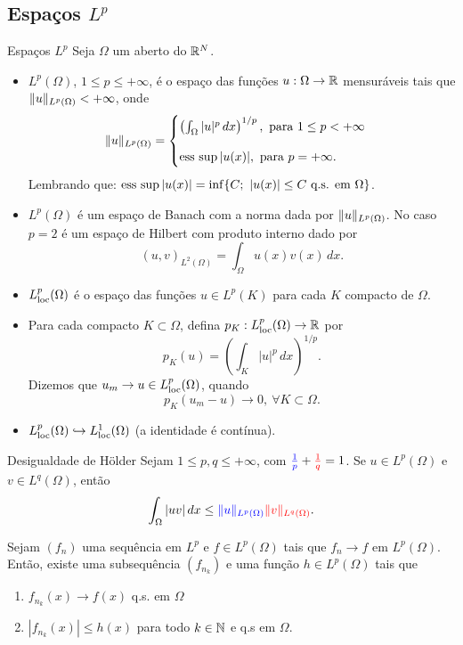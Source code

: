 \subsection*{Espaços $L^p$}
\begin{frame}{Espaços $L^p$}
Seja $\Omega$ um aberto do $\mathbb{R}^N$. 
\begin{itemize}
	\item $L^p(\Omega)$, $1\leq p\leq +\infty$, é o espaço das funções $u:\Omega \to \mathbb{R}$ mensuráveis tais que $\lVert u\rVert_{L^p(\Omega)}<+\infty$, onde 
\[	\lVert u\rVert_{L^p(\Omega)}=
\begin{cases}
\left(\int_\Omega |u|^p\,dx\right)^{1/p}, \text{ para } 1\leq p< +\infty \\[1em] 
\operatorname{ess\ sup} |u(x)|, \text{ para } p=+\infty.
\end{cases}
\]
Lembrando que: $\operatorname{ess\ sup} |u(x)|=\inf\{C;\ |u(x)|\leq C \text{ q.s. em } \Omega\}$.
\item $L^p(\Omega)$ é um espaço de Banach com a norma dada por $\lVert u\rVert_{L^p(\Omega)}$. No caso $p=2$ é um espaço de Hilbert com produto interno dado por
\[(u,v)_{L^2(\Omega)}=\int_\Omega u(x)v(x)\,dx.\]
\end{itemize}
\end{frame}

\begin{frame}
	\begin{itemize}
		\item $L_{\operatorname{loc}}^p(\Omega)$ é o espaço das funções $u\in L^p(K)$ para cada $K$ compacto de $\Omega$.
		\item Para cada compacto $K\subset \Omega$, defina $p_K:L_{\operatorname{loc}}^p(\Omega)\to \mathbb{R}$ por 
		\[p_K(u)=\left(\int_K|u|^p\,dx\right)^{1/p}.\]
		Dizemos que $u_m \to u \in  L_{\operatorname{loc}}^p(\Omega)$, quando
		\[p_K(u_m -u)\to 0,\ \forall K\subset \Omega.\]
	\item $L_{\operatorname{loc}}^p(\Omega)\hookrightarrow L_{\operatorname{loc}}^1(\Omega)$ (a identidade é contínua).
		\end{itemize}
\end{frame}


\begin{frame}
	\begin{block}{Desigualdade de H\"older}
	Sejam $1\leq p,q\leq +\infty $, com ${\color{blue}\frac{1}{p}}+{\color{red}\frac{1}{q}}=1$. Se {\color{blue}$u\in L^p(\Omega)$} e {\color{red}$v\in L^q(\Omega)$}, então
	\[\int_\Omega |uv|\, dx\leq {\color{blue}\lVert u\rVert_{L^p(\Omega)}}{\color{red}\lVert v\rVert_{L^q(\Omega)}}.\]
\end{block}

\begin{teo}
Sejam $(f_n)$ uma sequência em $L^p$ e $f\in L^p(\Omega)$ tais que $f_n\to f$ em $L^p(\Omega)$. Então, existe uma subsequência $(f_{n_{k}})$ e uma função $h\in L^p(\Omega)$ tais que
\begin{enumerate}[a]
	\item $f_{n_k}(x)\to f(x)$ q.s. em $\Omega$
	\item $|f_{n_k}(x)|\leq h(x)$ para todo $k\in \mathbb{N}$ e q.s em $\Omega$.
\end{enumerate}
\end{teo}
\end{frame}



